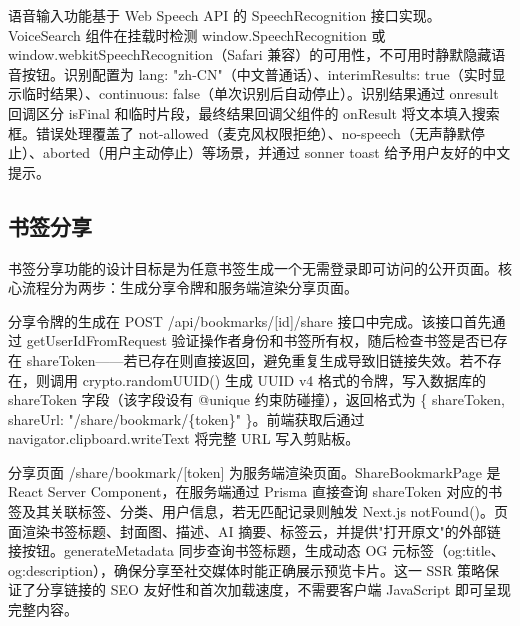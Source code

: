 \documentclass[a4paper,12pt]{ctexart}
\begin{document}
语音输入功能基于 Web Speech API 的 SpeechRecognition 接口实现。VoiceSearch 组件在挂载时检测 window.SpeechRecognition 或 window.webkitSpeechRecognition（Safari 兼容）的可用性，不可用时静默隐藏语音按钮。识别配置为 lang: "zh-CN"（中文普通话）、interimResults: true（实时显示临时结果）、continuous: false（单次识别后自动停止）。识别结果通过 onresult 回调区分 isFinal 和临时片段，最终结果回调父组件的 onResult 将文本填入搜索框。错误处理覆盖了 not-allowed（麦克风权限拒绝）、no-speech（无声静默停止）、aborted（用户主动停止）等场景，并通过 sonner toast 给予用户友好的中文提示。


\subsection{书签分享}

书签分享功能的设计目标是为任意书签生成一个无需登录即可访问的公开页面。核心流程分为两步：生成分享令牌和服务端渲染分享页面。

分享令牌的生成在 POST /api/bookmarks/[id]/share 接口中完成。该接口首先通过 getUserIdFromRequest 验证操作者身份和书签所有权，随后检查书签是否已存在 shareToken——若已存在则直接返回，避免重复生成导致旧链接失效。若不存在，则调用 crypto.randomUUID() 生成 UUID v4 格式的令牌，写入数据库的 shareToken 字段（该字段设有 @unique 约束防碰撞），返回格式为 \{ shareToken, shareUrl: "/share/bookmark/\{token\}" \}。前端获取后通过 navigator.clipboard.writeText 将完整 URL 写入剪贴板。

分享页面 /share/bookmark/[token] 为服务端渲染页面。ShareBookmarkPage 是 React Server Component，在服务端通过 Prisma 直接查询 shareToken 对应的书签及其关联标签、分类、用户信息，若无匹配记录则触发 Next.js notFound()。页面渲染书签标题、封面图、描述、AI 摘要、标签云，并提供"打开原文"的外部链接按钮。generateMetadata 同步查询书签标题，生成动态 OG 元标签（og:title、og:description），确保分享至社交媒体时能正确展示预览卡片。这一 SSR 策略保证了分享链接的 SEO 友好性和首次加载速度，不需要客户端 JavaScript 即可呈现完整内容。

\end{document}
